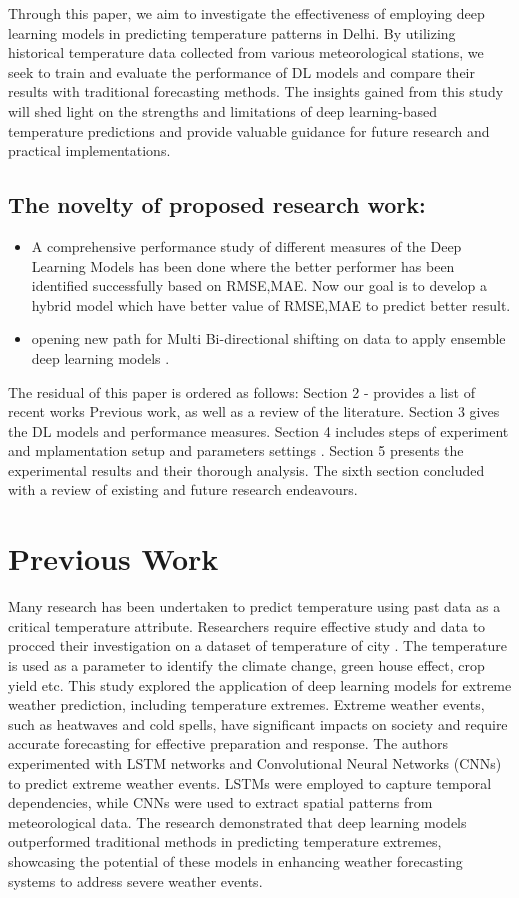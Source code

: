 \documentclass[sn-mathphys,Numbered]{sn-jnl}
\theoremstyle{thmstyleone}
\theoremstyle{thmstyletwo}
\theoremstyle{thmstylethree}
\begin{document}
Through this paper, we aim to investigate the effectiveness of employing deep learning models in predicting temperature patterns in Delhi. By utilizing historical temperature data collected from various meteorological stations, we seek to train and evaluate the performance of DL models and compare their results with traditional forecasting methods. The insights gained from this study will shed light on the strengths and limitations of deep learning-based temperature predictions and provide valuable guidance for future research and practical implementations.
\subsection{The novelty of proposed research work:}

\begin{itemize}
\item A comprehensive performance study of different measures of the Deep Learning Models has been done where the better performer has been identified successfully based on RMSE,MAE. Now our goal is to develop a hybrid model which have better value of RMSE,MAE to predict better result.
\item opening new path for Multi Bi-directional shifting on data to apply ensemble deep learning models .
\end{itemize}
The residual of this paper is ordered as follows: Section 2 - provides a list of recent works Previous work, as well as a review of the literature. Section 3 gives the DL models and performance measures. Section 4 includes steps of experiment and mplamentation setup and parameters settings . Section 5 presents the experimental results and their thorough analysis. The sixth section concluded with a review of existing and future research endeavours.

\section{Previous Work}
Many research has been undertaken to predict temperature using past data as a critical temperature attribute. Researchers require effective study and data to procced their investigation on a dataset of temperature of city \cite{cifuentes2020air}. The temperature is used as a parameter to identify the climate change,  green house effect, crop yield etc.
\cite{2019AGUFMGC33A..05P}This study explored the application of deep learning models for extreme weather prediction, including temperature extremes. Extreme weather events, such as heatwaves and cold spells, have significant impacts on society and require accurate forecasting for effective preparation and response. The authors experimented with LSTM networks and Convolutional Neural Networks (CNNs) to predict extreme weather events. LSTMs were employed to capture temporal dependencies, while CNNs were used to extract spatial patterns from meteorological data. The research demonstrated that deep learning models outperformed traditional methods in predicting temperature extremes, showcasing the potential of these models in enhancing weather forecasting systems to address severe weather events.
\end{document}
